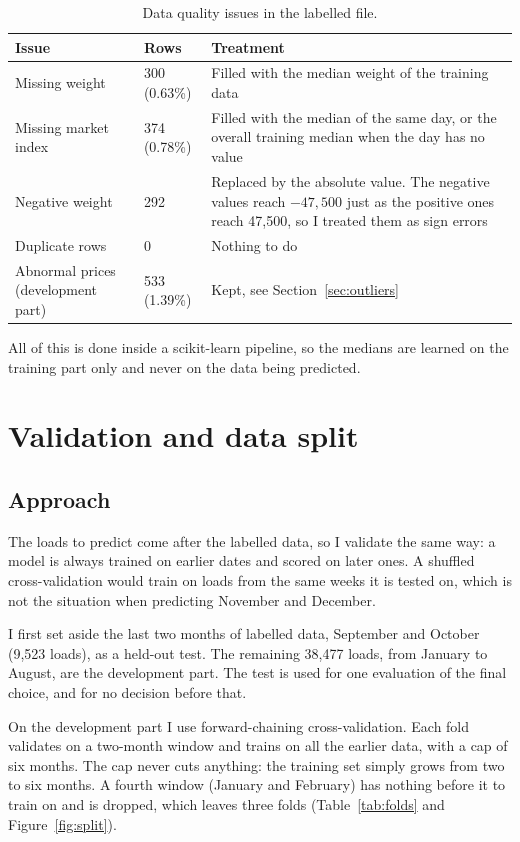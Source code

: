 \documentclass[a4paper,11pt]{article}
\begin{document}
\begin{table}[htbp]
\centering
\caption{Data quality issues in the labelled file.}
\label{tab:quality}
\small
\begin{tabular}{p{4.4cm}p{2.5cm}p{8.4cm}}
\toprule
Issue & Rows & Treatment \\
\midrule
Missing weight & 300 (0.63\%) & Filled with the median weight of the training data \\
Missing market index & 374 (0.78\%) & Filled with the median of the same day, or the overall training median when the day has no value \\
Negative weight & 292 & Replaced by the absolute value. The negative values reach $-47{,}500$ just as the positive ones reach 47,500, so I treated them as sign errors \\
Duplicate rows & 0 & Nothing to do \\
Abnormal prices (development part) & 533 (1.39\%) & Kept, see Section~\ref{sec:outliers} \\
\bottomrule
\end{tabular}
\end{table}

All of this is done inside a scikit-learn pipeline, so the medians are learned on the training part only and never on the data being predicted.

\section{Validation and data split}

\subsection{Approach}

The loads to predict come after the labelled data, so I validate the same way: a model is always trained on earlier dates and scored on later ones. A shuffled cross-validation would train on loads from the same weeks it is tested on, which is not the situation when predicting November and December.

I first set aside the last two months of labelled data, September and October (9,523 loads), as a held-out test. The remaining 38,477 loads, from January to August, are the development part. The test is used for one evaluation of the final choice, and for no decision before that.

On the development part I use forward-chaining cross-validation. Each fold validates on a two-month window and trains on all the earlier data, with a cap of six months. The cap never cuts anything: the training set simply grows from two to six months. A fourth window (January and February) has nothing before it to train on and is dropped, which leaves three folds (Table~\ref{tab:folds} and Figure~\ref{fig:split}).
\end{document}
